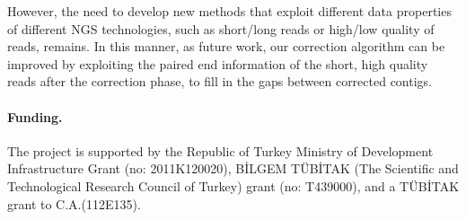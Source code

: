 \documentclass{llncs}
\begin{document}
However, the need to develop new methods that exploit different data properties of different NGS technologies, such as short/long reads or high/low quality of reads, remains. In this manner, as future work, our correction algorithm can be improved by exploiting the paired end information of the short, high quality reads after the correction phase, to fill in the gaps between corrected contigs.

\paragraph{Funding.}

The project is supported by the Republic of Turkey Ministry of Development Infrastructure Grant (no: 2011K120020), BİLGEM TÜBİTAK (The Scientific and Technological Research Council of Turkey) grant (no: T439000), and a TÜBİTAK grant to C.A.(112E135).\\
\end{document}
